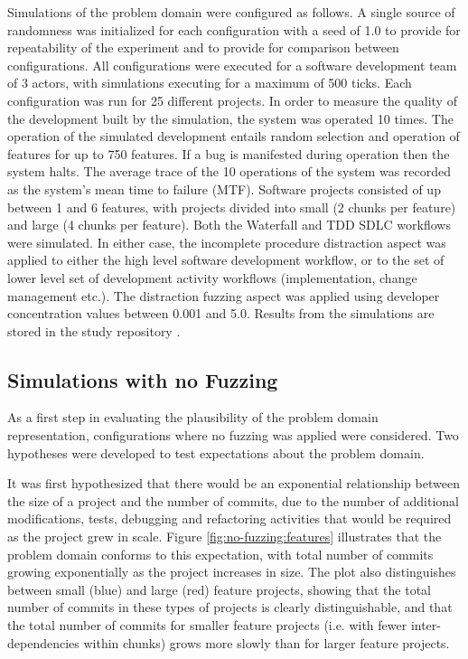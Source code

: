 \documentclass{llncs}
\begin{document}
Simulations of the problem domain were configured as follows.  A single source of randomness was initialized for each
configuration with a seed of 1.0 to provide for repeatability of the experiment and to provide for comparison between
configurations. All configurations were executed for a software development team of 3 actors, with simulations executing
for a maximum of 500 ticks.  Each configuration was run for 25 different projects.  In order to measure the quality of
the development built by the simulation, the system was operated 10 times.  The operation of the simulated development
entails random selection and operation of features for up to 750 features.  If a bug is manifested during operation then
the system halts.  The average trace of the 10 operations of the system was recorded as the system's mean time to
failure (MTF). Software projects consisted of up between 1 and 6 features, with projects divided into small (2 chunks
per feature) and large (4 chunks per feature). Both the Waterfall and TDD SDLC workflows were simulated.  In either
case, the incomplete procedure distraction aspect was applied to either the high level software development workflow, or
to the set of lower level set of development activity workflows (implementation, change management etc.).  The
distraction fuzzing aspect was applied using developer concentration values between 0.001 and 5.0.  Results from the
simulations are stored in the study repository \citep{storer2016softdev-workflow-scm}.


\subsection{Simulations with no Fuzzing}


As a first step in evaluating the plausibility of the problem domain representation, configurations where no fuzzing was
applied were considered.  Two hypotheses were developed to test expectations about the problem domain.

It was first hypothesized that there would be an exponential relationship between the size of a project and the number
of commits, due to the number of additional modifications, tests, debugging and refactoring activities that would be
required as the project grew in scale.  Figure \ref{fig:no-fuzzing:features} illustrates that the problem domain
conforms to this expectation, with total number of commits growing exponentially as the project increases in size.  The
plot also distinguishes between small (blue) and large (red) feature projects, showing that the total number of commits
in these types of projects is clearly distinguishable, and that the total number of commits for smaller feature projects
(i.e. with fewer inter-dependencies within chunks) grows more slowly than for larger feature projects.
\end{document}
